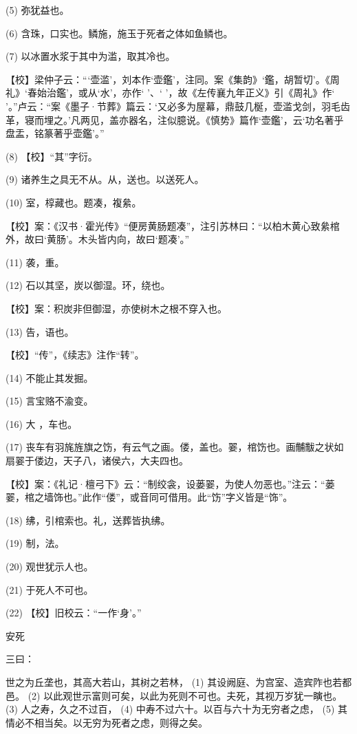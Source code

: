 \documentclass[12pt,UTF8]{ctexbook}
\begin{document}
(5) 弥犹益也。

(6) 含珠，口实也。鳞施，施玉于死者之体如鱼鳞也。

(7) 以冰置水浆于其中为滥，取其冷也。

【校】梁仲子云：“‘壶滥’，刘本作‘壶鑑’，注同。案《集韵》‘鑑，胡暂切’。《周礼》‘春始治鑑’，或从‘水’，亦作‘ ’、‘ ’，故《左传襄九年正义》引《周礼》作‘ ’。”卢云：“案《墨子·节葬》篇云：‘又必多为屋幕，鼎鼓几梴，壶滥戈剑，羽毛齿革，寝而埋之。’凡两见，盖亦器名，注似臆说。《慎势》篇作‘壶鑑’，云‘功名著乎盘盂，铭篆著乎壶鑑’。”

(8) 【校】“其”字衍。

(9) 诸养生之具无不从。从，送也。以送死人。

(10) 室，椁藏也。题凑，複絫。

【校】案：《汉书·霍光传》“便房黄肠题凑”，注引苏林曰：“以柏木黄心致絫棺外，故曰‘黄肠’。木头皆内向，故曰‘题凑’。”

(11) 袭，重。

(12) 石以其坚，炭以御湿。环，绕也。

【校】案：积炭非但御湿，亦使树木之根不穿入也。

(13) 告，语也。

【校】“传”，《续志》注作“转”。

(14) 不能止其发掘。

(15) 言宝赂不渝变。

(16) 大 ，车也。

(17) 丧车有羽旄旌旗之饬，有云气之画。偻，盖也。翣，棺饬也。画黼黻之状如扇翣于偻边，天子八，诸侯六，大夫四也。

【校】案：《礼记·檀弓下》云：“制绞衾，设蒌翣，为使人勿恶也。”注云：“蒌翣，棺之墙饰也。”此作“偻”，或音同可借用。此“饬”字义皆是“饰”。

(18) 绋，引棺索也。礼，送葬皆执绋。

(19) 制，法。

(20) 观世犹示人也。

(21) 于死人不可也。

(22) 【校】旧校云：“一作‘身’。”





安死


三曰：

世之为丘垄也，其高大若山，其树之若林， (1) 其设阙庭、为宫室、造宾阼也若都邑。 (2) 以此观世示富则可矣，以此为死则不可也。夫死，其视万岁犹一瞚也。 (3) 人之寿，久之不过百， (4) 中寿不过六十。以百与六十为无穷者之虑， (5) 其情必不相当矣。以无穷为死者之虑，则得之矣。
\end{document}
